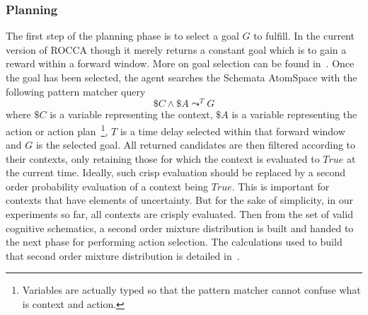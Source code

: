 \documentclass[runningheads]{llncs}
\newcommand{\TTrue}{\textit{True}}
\newcommand{\lpreimp}[1]{\leadsto^{#1}}
\begin{document}
\subsubsection{Planning}
The first step of the planning phase is to select a goal $G$ to
fulfill.  In the current version of ROCCA though it merely returns a
constant goal which is to gain a reward within a forward window.  More
on goal selection can be found in~\cite{Goertzel2014EGI1, Hahm2021}.
Once the goal has been selected, the agent searches the Schemata
AtomSpace with the following pattern matcher query
$$\$C \land \$A \lpreimp{T} G$$
where
$\$C$ is a variable representing the context, $\$A$ is a variable
representing the action or action plan~\footnote{Variables are
  actually typed so that the pattern matcher cannot confuse what is
  context and action.}, $T$ is a time delay selected within that
forward window and $G$ is the selected goal.  All returned candidates
are then filtered according to their contexts, only retaining those
for which the context is evaluated to $\TTrue$ at the current time.
Ideally, such crisp evaluation should be replaced by a second order
probability evaluation of a context being $\TTrue$.  This is important
for contexts that have elements of uncertainty.  But for the sake of
simplicity, in our experiments so far, all contexts are crisply
evaluated.  Then from the set of valid cognitive schematics, a second
order mixture distribution is built and handed to the next phase for
performing action selection.  The calculations used to build that
second order mixture distribution is detailed
in~\cite{Geisweiller2018}.
\end{document}
